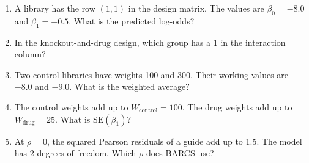 \documentclass[12pt]{article}
\begin{document}
\begin{enumerate}[label=\textbf{Q\arabic*.},leftmargin=2.6em,itemsep=6pt]
\item A library has the row $(1, 1)$ in the design matrix. The values are
$\beta_0 = -8.0$ and $\beta_1 = -0.5$. What is the predicted log-odds?

\item In the knockout-and-drug design, which group has a 1 in the
interaction column?

\item Two control libraries have weights 100 and 300. Their working values
are $-8.0$ and $-9.0$. What is the weighted average?

\item The control weights add up to $W_{\text{control}} = 100$. The drug
weights add up to $W_{\text{drug}} = 25$. What is $\text{SE}(\beta_1)$?

\item At $\rho = 0$, the squared Pearson residuals of a guide add up to 1.5.
The model has 2 degrees of freedom. Which $\rho$ does BARCS use?


\end{enumerate}
\end{document}
